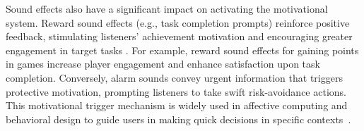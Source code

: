 
Sound effects also have a significant impact on activating the motivational system. Reward sound effects (e.g., task completion prompts) reinforce positive feedback, stimulating listeners’ achievement motivation and encouraging greater engagement in target tasks \cite{fogg2009behavior}. For example, reward sound effects for gaining points in games increase player engagement and enhance satisfaction upon task completion. Conversely, alarm sounds convey urgent information that triggers protective motivation, prompting listeners to take swift risk-avoidance actions. This motivational trigger mechanism is widely used in affective computing and behavioral design to guide users in making quick decisions in specific contexts~\cite{mazur2019effects}.

